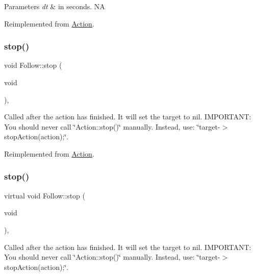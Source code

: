 \begin{DoxyParams}{Parameters}
{\em dt} & in seconds.  NA \\
\hline
\end{DoxyParams}


Reimplemented from \hyperlink{classAction_a9a64ee9e8e977672748f70893ebaff66}{Action}.

\mbox{\label{classFollow_a2cd8dbd76066ecb517c6d5bdca032d6c}} 
\subsubsection{\texorpdfstring{stop()}{stop()}\hspace{0.1cm}{\footnotesize\ttfamily [1/2]}}
{\footnotesize\ttfamily void Follow\+::stop (\begin{DoxyParamCaption}\item[{void}]{ }\end{DoxyParamCaption})\hspace{0.3cm}{\ttfamily [override]}, {\ttfamily [virtual]}}

Called after the action has finished. It will set the \textquotesingle{}target\textquotesingle{} to nil. I\+M\+P\+O\+R\+T\+A\+NT\+: You should never call \char`\"{}\+Action\+::stop()\char`\"{} manually. Instead, use\+: \char`\"{}target-\/$>$stop\+Action(action);\char`\"{}. 

Reimplemented from \hyperlink{classAction_a968267fa7a1dcc46a2976249a712d3c8}{Action}.

\mbox{\label{classFollow_af3b58aa360668e6e1203a48f23276b74}} 
\subsubsection{\texorpdfstring{stop()}{stop()}\hspace{0.1cm}{\footnotesize\ttfamily [2/2]}}
{\footnotesize\ttfamily virtual void Follow\+::stop (\begin{DoxyParamCaption}\item[{void}]{ }\end{DoxyParamCaption})\hspace{0.3cm}{\ttfamily [override]}, {\ttfamily [virtual]}}

Called after the action has finished. It will set the \textquotesingle{}target\textquotesingle{} to nil. I\+M\+P\+O\+R\+T\+A\+NT\+: You should never call \char`\"{}\+Action\+::stop()\char`\"{} manually. Instead, use\+: \char`\"{}target-\/$>$stop\+Action(action);\char`\"{}. 

